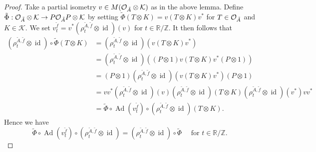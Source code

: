 \documentclass[11pt]{article}
\theoremstyle{plain}
\theoremstyle{definition}
\numberwithin{equation}{section}
\newcommand{\id}{\operatorname{id}}
\newcommand{\Ad}{\operatorname{Ad}}
\newcommand{\RZ}{\mathbb{R}/{\mathbb{Z}}}
\newcommand{\f}{\tilde{f}}
\begin{document}
\begin{proof}
Take a partial isometry
$v \in M({{\mathcal{O}}_{\tilde{A}}\otimes{\mathcal{K}}})$
as in the above lemma.
Define 
$\tilde{\Phi}:{{\mathcal{O}}_{\tilde{A}}\otimes{\mathcal{K}}} \rightarrow 
P{\mathcal{O}}_{\tilde{A}}P \otimes{\mathcal{K}}
$
by setting
$\tilde{\Phi}(T\otimes K) = v (T \otimes K)v^*$ for $T \in {{\mathcal{O}}_{\tilde{A}}}$
and
$K\in \mathcal{K}$.
We set 
$v_t^{\f}  = v^*(\rho_t^{\tilde{A},\f}\otimes \id) (v)$ 
for $t \in \RZ$.
It then follows that
\begin{align*}
(\rho^{\tilde{A},\f}_t\otimes \id) \circ \tilde{\Phi}(T\otimes K) 
& = (\rho^{\tilde{A},\f}_t\otimes \id) (v (T \otimes K)v^*) \\ 
& = (\rho^{\tilde{A},\f}_t\otimes \id) 
((P\otimes 1)v (T \otimes K)v^*(P\otimes 1)) \\ 
& = (P\otimes 1)(\rho^{\tilde{A},\f}_t\otimes \id) (v (T \otimes K) v^*)
    (P\otimes 1) \\ 
& = v v^*(\rho^{\tilde{A},\f}_t\otimes \id) (v) 
         (\rho^{\tilde{A},\f}_t\otimes \id)(T \otimes K)
         (\rho^{\tilde{A},\f}_t\otimes \id)(v^*) v v^* \\ 
& = \tilde{\Phi}\circ \Ad(v_t^{\f})\circ 
(\rho^{\tilde{A},\f}_t\otimes \id)(T \otimes K).
\end{align*}
Hence we have
\begin{equation*}
\tilde{\Phi} \circ \Ad(v_t^{\f}) \circ (\rho^{\tilde{A},\f}_t\otimes \id)
 = (\rho^{\tilde{A},{\f}}_t\otimes\id) \circ \tilde{\Phi}
\quad
\text{ for }
 t \in \RZ.
\end{equation*}
\end{proof}
\end{document}
